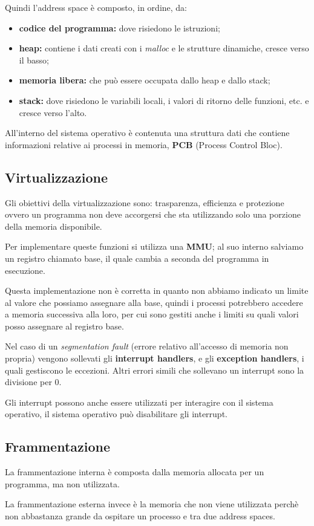 Quindi l'address space è composto, in ordine, da:
\begin{itemize}
  \item \textbf{codice del programma:} dove risiedono le istruzioni;
  \item \textbf{heap:} contiene i dati creati con i \emph{malloc} e le
    strutture dinamiche, cresce verso il basso;
  \item \textbf{memoria libera:} che può essere occupata dallo heap e dallo
    stack;
  \item \textbf{stack:} dove risiedono le variabili locali, i valori di ritorno
    delle funzioni, etc. e cresce verso l'alto.
\end{itemize}


All'interno del sistema operativo è contenuta una struttura dati che contiene
informazioni relative ai processi in memoria, \textbf{PCB} (Process Control
Bloc).

\subsection{Virtualizzazione}
Gli obiettivi della virtualizzazione sono: trasparenza, efficienza e protezione
ovvero un programma non deve accorgersi che sta utilizzando solo una porzione
della memoria disponibile.


Per implementare queste funzioni si utilizza una \textbf{MMU}; al suo interno
salviamo un registro chiamato base, il quale cambia a seconda del programma
in esecuzione.

Questa implementazione non è corretta in quanto non abbiamo indicato un limite
al valore che possiamo assegnare alla base, quindi i processi potrebbero
accedere a memoria successiva alla loro, per cui sono gestiti anche i limiti
su quali valori posso assegnare al registro base.

Nel caso di un \textit{segmentation fault} (errore relativo all'accesso di
memoria non propria) vengono sollevati gli \textbf{interrupt handlers}, e gli
\textbf{exception handlers}, i quali gestiscono le eccezioni.
Altri errori simili che sollevano un interrupt sono la divisione per $0$.

Gli interrupt possono anche essere utilizzati per interagire con il sistema
operativo, il sistema operativo può disabilitare gli interrupt.

\subsection{Frammentazione}
La frammentazione interna è composta dalla memoria allocata per un programma,
ma non utilizzata.

La frammentazione esterna invece è la memoria che non viene utilizzata perchè
non abbastanza grande da ospitare un processo e tra due address spaces.
